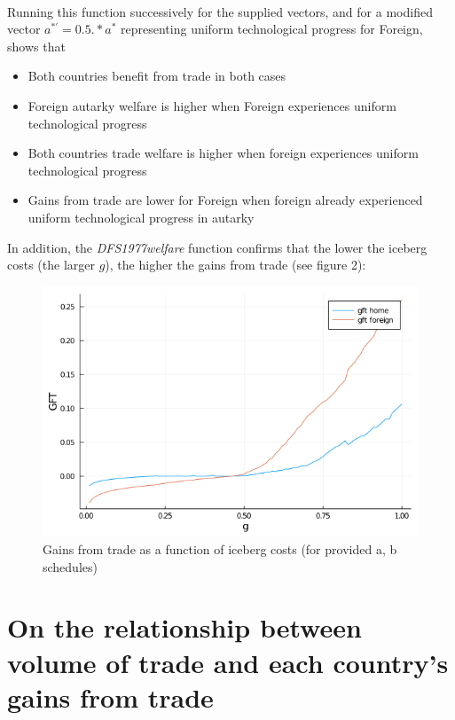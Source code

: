 \documentclass[10pt, final]{article}
\begin{document}
\\
Running this function successively for the supplied vectors, and for a modified vector $ a^{*'} = 0.5 .* a^{*} $ representing uniform technological progress for Foreign, shows that
\begin{itemize}
	\item Both countries benefit from trade in both cases
	\item Foreign autarky welfare is higher when Foreign experiences uniform technological progress
	\item Both countries trade welfare is higher when foreign experiences uniform technological progress
	\item Gains from trade are lower for Foreign when foreign already experienced uniform technological progress in autarky
\end{itemize}

\bigskip

\noindent In addition, the \textit{DFS1977welfare} function confirms that the lower the iceberg costs (the larger $g$), the higher the gains from trade (see figure 2):
\begin{figure}[h!]
\center
\includegraphics[width=12cm]{Fig2_WelfareGains_g}
\caption{Gains from trade as a function of iceberg costs (for provided a, b schedules)}
\end{figure}


\section{On the relationship between volume of trade and each country's gains from trade} %
\end{document}
